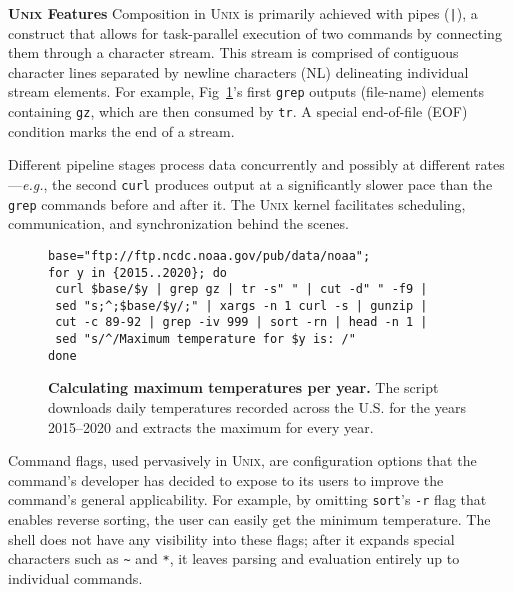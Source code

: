 \documentclass[sigplan, review, screen, anonymous]{acmart}
\newcommand{\eg}{{\em e.g.}, }
\newcommand{\heading}[1]{\vspace{4pt}\noindent\textbf{#1}\enspace}
\newcommand{\ttt}[1]{\texttt{#1}}
\newcommand{\unix}{{\scshape Unix}\xspace}
\begin{document}
\heading{\unix Features}
Composition in \unix is primarily achieved with pipes (\ttt{|}), a
construct that allows for task-parallel execution of two commands by
connecting them through a character stream.
This stream is comprised of contiguous character lines separated by newline characters (\textsc{NL}) delineating individual stream elements.
For example, Fig~\ref{fig:example}'s first \ttt{grep} outputs (file-name) elements containing \ttt{gz}, which are then consumed by \ttt{tr}.
A special end-of-file (\textsc{EOF}) condition marks the end of a stream.

Different pipeline stages process data concurrently and possibly at different rates---\eg the second \ttt{curl} produces output at a significantly slower pace than the \ttt{grep} commands before and after it.
The \unix kernel facilitates scheduling, communication, and synchronization behind the scenes.

\begin{figure}[t]
\centering
\begin{verbatim}
base="ftp://ftp.ncdc.noaa.gov/pub/data/noaa";
for y in {2015..2020}; do
 curl $base/$y | grep gz | tr -s" " | cut -d" " -f9 |
 sed "s;^;$base/$y/;" | xargs -n 1 curl -s | gunzip |
 cut -c 89-92 | grep -iv 999 | sort -rn | head -n 1 |
 sed "s/^/Maximum temperature for $y is: /"
done
\end{verbatim}
\caption{
  \textbf{Calculating maximum temperatures per year.}
  The script downloads daily temperatures recorded across the U.S. for the years 2015--2020 and extracts the maximum for every year.
}
\vspace{-15pt}
\label{fig:example}
\end{figure}


Command flags, used pervasively in \unix, are configuration options that the command's developer has decided to expose to its users to improve the command's general applicability.
For example, by omitting  \ttt{sort}'s \ttt{-r} flag that enables reverse sorting, the user can easily get the minimum temperature.
The shell does not have any visibility into these flags; 
  after it expands special characters such as \ttt{\textasciitilde{}} and \ttt{*}, it leaves parsing and evaluation entirely up to individual commands.
\end{document}
